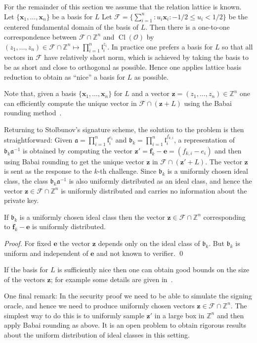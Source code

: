 \documentclass{llncs}
\newcommand{\FF}{\mathcal{F}}
\newcommand{\OO}{\mathcal{O}}
\newcommand{\Z}{\mathbb{Z}}
\DeclareMathOperator{\Cl}{Cl}
\renewcommand{\a}{\mathfrak{a}}
\renewcommand{\b}{\mathfrak{b}}
\renewcommand{\l}{\mathfrak{l}}
\newcommand{\e}{\mathbf{e}}
\newcommand{\f}{\mathbf{f}}
\newcommand{\x}{\mathbf{x}}
\newcommand{\z}{\mathbf{z}}
\begin{document}
For the remainder of this section we assume that the relation lattice is known.
Let $\{ \x_1, \dots, \x_n \}$ be a basis for $L$
Let $\FF = \{ \sum_{i=1}^n : u_i \x_i : -1/2 \le u_i < 1/2 \}$ be the centered fundamental domain of the basis of $L$.
Then there is a one-to-one correspondence between $\FF \cap \Z^n$ and $\Cl(\OO)$ by
$(z_1, \dots, z_n ) \in \FF \cap \Z^n  \mapsto \prod_{i=1}^n \l_i^{z_i}$.
In practice one prefers a basis for $L$ so that all vectors in $\FF$ have relatively short norm, which is achieved by taking the basis to be as short and close to orthogonal as possible. Hence one applies lattice basis reduction to obtain as ``nice'' a basis for $L$ as possible.

Note that, given a basis $\{ \x_1, \dots, \x_n \}$ for $L$ and a vector $\z = (z_1, \dots, z_n ) \in \Z^n$ one can efficiently compute the unique vector in $\FF \cap (\z + L )$ using the Babai rounding method~\cite{Bab86}.



Returning to Stolbunov's signature scheme, the solution to the problem is then straightforward:
Given $\a = \prod_{i=1}^n \l_i^{e_i}$ and $\b_k = \prod_{i=1}^n \l_i^{f_{k,i}}$,
a representation of $\b_k \a^{-1}$ is obtained by computing the vector $\z' = \f_k - \e = (f_{k,i} - e_i)$
and then using Babai rounding to get the unique vector $\z$ in $\FF \cap (\z' + L )$.
The vector $\z$ is sent as the response to the $k$-th challenge.
Since $\b_k$ is a uniformly chosen ideal class, the class $\b_k \a^{-1}$ is also uniformly distributed as an ideal class, and hence the vector $\z \in \FF \cap \Z^n$ is uniformly distributed and carries no information about the private key.

\begin{lemma}
If $\b_k$ is a uniformly chosen ideal class then the vector 
$\z \in \FF \cap \Z^n$ corresponding to $\f_k - \e$ is uniformly distributed.
\end{lemma}

\begin{proof}
For fixed $\e$ the vector $\z$ depends only on the ideal class of $\b_k$.
But $\b_k$ is uniform and independent of $\e$ and not known to verifier. \qed
\end{proof}



If the basis for $L$ is sufficiently nice then one can obtain good bounds on the size of the vectors $\z$; for example some details are given in~\cite{BS18}.

One final remark: In the security proof we need to be able to simulate the signing oracle, and hence we need to produce uniformly chosen vectors $\z \in \FF \cap \Z^n$.
The simplest way to do this is to uniformly sample $\z'$ in a large box in $\Z^n$ and then apply Babai rounding as above.
It is an open problem to obtain rigorous results about the uniform distribution of ideal classes in this setting.
\end{document}

